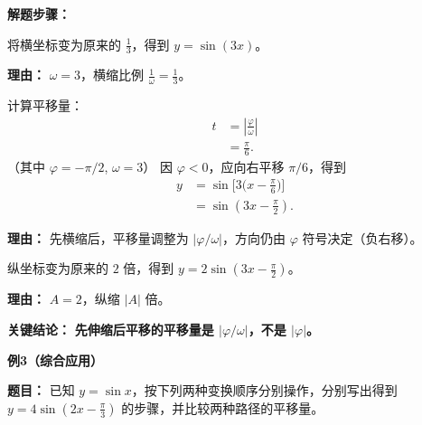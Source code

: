\begin{examplebox}
	\textbf{\textcolor{CExample}{解题步骤：}}
	\begin{description}[style=nextline, leftmargin=2.8em, labelsep=0.5em, itemsep=0.45em]
		\item[\textbf{第一步（横缩周期）：}] 将横坐标变为原来的 $\frac{1}{3}$，得到 $y=\sin(3x)$。
			\par\textbf{理由：}
			$\omega=3$，横缩比例 $\frac{1}{\omega}=\frac{1}{3}$。
		\item[\textbf{第二步（右移相位）：}] 计算平移量：
			\[
				\begin{aligned}
					t &= \left|\frac{\varphi}{\omega}\right| \\
					&= \frac{\pi}{6}.
			\end{aligned}
			\]
			（其中 $\varphi=-\pi/2$, $\omega=3$）
			因 $\varphi<0$，应向右平移 $\pi/6$，得到
			\[
				\begin{aligned}
					y &= \sin\!\big[3\big(x-\frac{\pi}{6}\big)\big] \\
					&= \sin(3x-\frac{\pi}{2}).
			\end{aligned}
			\]
			\par\textbf{理由：}
			先横缩后，平移量调整为 $|\varphi/\omega|$，方向仍由 $\varphi$ 符号决定（负右移）。
		\item[\textbf{第三步（纵缩振幅）：}] 纵坐标变为原来的 $2$ 倍，得到 $y=2\sin(3x-\frac{\pi}{2})$。
			\par\textbf{理由：}
			$A=2$，纵缩 $|A|$ 倍。
	\end{description}

	\textbf{\textcolor{CExample}{关键结论：}}
	\textbf{先伸缩后平移的平移量是 $|\varphi/\omega|$，不是 $|\varphi|$。}

	\medskip
	\textbf{\textcolor{CExample}{例3（综合应用）}}

	\textbf{\textcolor{CExample}{题目：}}
	已知 $y=\sin x$，按下列两种变换顺序分别操作，分别写出得到 $y=4\sin(2x-\frac{\pi}{3})$ 的步骤，并比较两种路径的平移量。


\end{examplebox}
